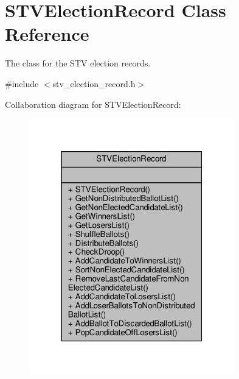 \hypertarget{classSTVElectionRecord}{}\section{S\+T\+V\+Election\+Record Class Reference}
\label{classSTVElectionRecord}


The class for the S\+TV election records.  




{\ttfamily \#include $<$stv\+\_\+election\+\_\+record.\+h$>$}



Collaboration diagram for S\+T\+V\+Election\+Record\+:\nopagebreak
\begin{figure}[H]
\begin{center}
\leavevmode
\includegraphics[width=253pt]{classSTVElectionRecord__coll__graph}
\end{center}
\end{figure}
